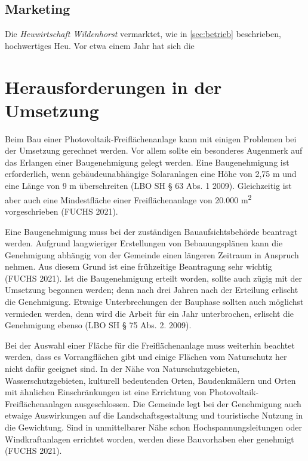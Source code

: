 \documentclass[11pt]{scrartcl}
\begin{document}
\subsection{Marketing}
Die \textit{Heuwirtschaft Wildenhorst} vermarktet, wie in \cref{sec:betrieb} beschrieben, hochwertiges Heu.
Vor etwa einem Jahr hat sich die



\section{Herausforderungen in der Umsetzung}
Beim Bau einer Photovoltaik-Freiflächenanlage kann mit einigen Problemen bei der Umsetzung gerechnet werden.
Vor allem sollte ein besonderes Augenmerk auf das Erlangen einer Baugenehmigung gelegt werden.
Eine Baugenehmigung ist erforderlich, wenn gebäudeunabhängige Solaranlagen eine Höhe von 2,75 m und eine Länge von 9 m überschreiten (LBO SH § 63 Abs. 1 2009).
Gleichzeitig ist aber auch eine Mindestfläche einer Freiflächenanlage von 20.000 m\textsuperscript{2} vorgeschrieben (FUCHS 2021).
 
Eine Baugenehmigung muss bei der zuständigen Bauaufsichtsbehörde beantragt werden.
Aufgrund langwieriger Erstellungen von Bebauungsplänen kann die Genehmigung abhängig von der Gemeinde einen längeren Zeitraum in Anspruch nehmen.
Aus diesem Grund ist eine frühzeitige Beantragung sehr wichtig (FUCHS 2021).
Ist die Baugenehmigung erteilt worden, sollte auch zügig mit der Umsetzung begonnen werden; denn nach drei Jahren nach der Erteilung erlischt die Genehmigung.
Etwaige Unterbrechungen der Bauphase sollten auch möglichst vermieden werden, denn wird die Arbeit für ein Jahr unterbrochen, erlischt die Genehmigung ebenso (LBO SH § 75 Abs. 2. 2009).

Bei der Auswahl einer Fläche für die Freiflächenanlage muss weiterhin beachtet werden, dass es Vorrangflächen gibt und einige Flächen vom Naturschutz her nicht dafür geeignet sind.
In der Nähe von Naturschutzgebieten, Wasserschutzgebieten, kulturell bedeutenden Orten, Baudenkmälern und Orten mit ähnlichen Einschränkungen ist eine Errichtung von Photovoltaik-Freiflächenanlagen ausgeschlossen.
Die Gemeinde legt bei der Genehmigung auch etwaige Auswirkungen auf die Landschaftsgestaltung und touristische Nutzung in die Gewichtung.
Sind in unmittelbarer Nähe schon Hochspannungsleitungen oder Windkraftanlagen errichtet worden, werden diese Bauvorhaben eher genehmigt (FUCHS 2021).
\end{document}
